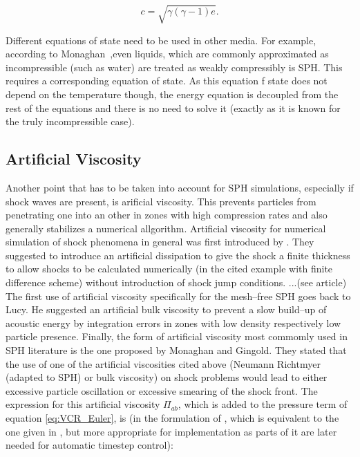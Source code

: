 \documentclass{report}
\begin{document}
\begin{equation}
 c=\sqrt{\gamma(\gamma-1)e}.
\end{equation}

Different equations of state need to be used in other media. For example, according to Monaghan~\cite{Monaghan1994,Monaghan2005},even liquids, which are commonly approximated
as incompressible (such as water) are treated as weakly compressibly is SPH. This requires a corresponding equation of state. As this equation f state does not depend on the temperature though, the energy equation is decoupled from the rest of the equations and there is no need to solve it (exactly as it is known for the truly incompressible case).



\subsection{Artificial Viscosity}
\label{sec:ArtVisc}

Another point that has to be taken into account for SPH simulations, especially
if shock waves are present, is arificial viscosity\cite{Monaghan2005}. This
prevents particles from penetrating one into an other in zones with high
compression rates and also generally stabilizes a numerical
allgorithm.
Artificial viscosity for numerical simulation of shock phenomena
in general was first introduced by \cite{vonNeumann1950}. They suggested to
introduce an artificial dissipation to give the shock a finite thickness to 
allow shocks to be calculated numerically (in the cited example with finite difference
scheme) without introduction of shock jump conditions.    ...(see article)
The first use of artificial viscosity specifically for the mesh--free SPH goes
back to Lucy\cite{Lucy1977}. He suggested an artificial bulk viscosity to
prevent a slow build--up of acoustic energy by integration errors in zones with
low density respectively low particle presence. 
Finally, the form of artificial viscosity most commomly used in SPH
literature\cite{Liu2003} is the one proposed by Monaghan and
Gingold\cite{Monaghan1983}. They stated that the use of one of the artificial
viscosities cited above (Neumann Richtmyer (adapted to SPH) or bulk
viscosity) on shock problems would lead to either excessive particle
oscillation or excessive smearing of the shock front. The expression for this
artificial viscosity $\Pi_{ab}$, which is added to the pressure term of
equation \ref{eq:VCR_Euler}, is (in the formulation of \cite{Monaghan1992}, which is equivalent to the one given in \cite{Monaghan2005}, but more appropriate for implementation as parts of it are later needed for automatic timestep control):
\end{document}
